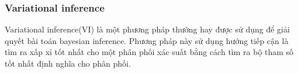 

 
        
        \subsubsection{Variational inference}
        Variational inference(VI) là một phương pháp thường hay được sử dụng để giải quyết bài toán bayesian inference. Phương pháp này sử dụng hướng tiếp cận là tìm ra xấp xỉ tốt nhất cho một phân phối xác suất bằng cách tìm ra bộ tham số tốt nhất định nghĩa cho phân phối. 

